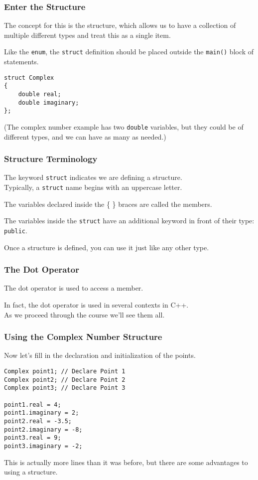 \begin{frame}[fragile]
\frametitle{Enter the Structure}

The concept for this is the \alert{structure}, which allows us to have a collection of multiple different types and treat this as a single item.

Like the \texttt{enum}, the \texttt{struct} definition should be placed outside the \texttt{main()} block of statements.

\begin{verbatim}
struct Complex
{
    double real;
    double imaginary;
};
\end{verbatim}

(The complex number example has two \texttt{double} variables, but they could be of different types, and we can have as many as needed.)

\end{frame}

\begin{frame}
\frametitle{Structure Terminology}
The keyword \texttt{struct} indicates we are defining a structure.\\
\quad Typically, a \texttt{struct} name begins with an uppercase letter.

The variables declared inside the \{ \} braces are called the \alert{members}.

The variables inside the \texttt{struct} have an additional keyword in front of their type: \texttt{public}.

Once a structure is defined, you can use it just like any other type.

\end{frame}

\begin{frame}
\frametitle{The Dot Operator}
The \alert{dot operator} is used to access a member.

In fact, the dot operator is used in several contexts in C++.\\
\quad As we proceed through the course we'll see them all.

\end{frame}

\begin{frame}[fragile]
\frametitle{Using the Complex Number Structure}

Now let's fill in the declaration and initialization of the points.

\begin{verbatim}
Complex point1; // Declare Point 1
Complex point2; // Declare Point 2
Complex point3; // Declare Point 3

point1.real = 4;
point1.imaginary = 2;
point2.real = -3.5;
point2.imaginary = -8;
point3.real = 9;
point3.imaginary = -2;

\end{verbatim}

This is actually more lines than it was before, but there are some advantages to using a structure.

\end{frame}

